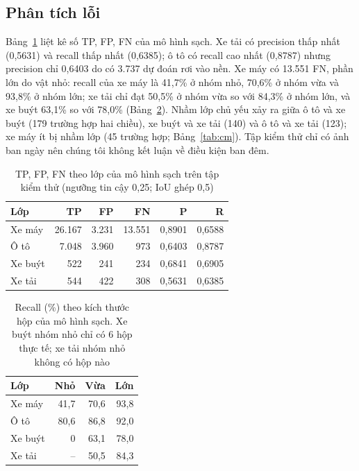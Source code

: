 \documentclass[10pt,journal,letterpaper]{IEEEtran}
\begin{document}
\subsection{Phân tích lỗi}
Bảng~\ref{tab:err} liệt kê số TP, FP, FN của mô hình sạch. Xe tải có precision thấp nhất (0,5631) và recall thấp nhất (0,6385); ô tô có recall cao nhất (0,8787) nhưng precision chỉ 0,6403 do có 3.737 dự đoán rơi vào nền. Xe máy có 13.551 FN, phần lớn do vật nhỏ: recall của xe máy là 41,7\% ở nhóm nhỏ, 70,6\% ở nhóm vừa và 93,8\% ở nhóm lớn; xe tải chỉ đạt 50,5\% ở nhóm vừa so với 84,3\% ở nhóm lớn, và xe buýt 63,1\% so với 78,0\% (Bảng~\ref{tab:size}). Nhầm lớp chủ yếu xảy ra giữa ô tô và xe buýt (179 trường hợp hai chiều), xe buýt và xe tải (140) và ô tô và xe tải (123); xe máy ít bị nhầm lớp (45 trường hợp; Bảng~\ref{tab:cm}). Tập kiểm thử chỉ có ảnh ban ngày nên chúng tôi không kết luận về điều kiện ban đêm.

\begin{table}[!t]
\caption{TP, FP, FN theo lớp của mô hình sạch trên tập kiểm thử (ngưỡng tin cậy 0,25; IoU ghép 0,5)}
\label{tab:err}
\centering
\footnotesize
\begin{tabular}{lrrrrr}
\toprule
Lớp & TP & FP & FN & P & R \\
\midrule
Xe máy & 26.167 & 3.231 & 13.551 & 0,8901 & 0,6588 \\
Ô tô & 7.048 & 3.960 & 973 & 0,6403 & 0,8787 \\
Xe buýt & 522 & 241 & 234 & 0,6841 & 0,6905 \\
Xe tải & 544 & 422 & 308 & 0,5631 & 0,6385 \\
\bottomrule
\end{tabular}
\end{table}

\begin{table}[!t]
\caption{Recall (\%) theo kích thước hộp của mô hình sạch. Xe buýt nhóm nhỏ chỉ có 6 hộp thực tế; xe tải nhóm nhỏ không có hộp nào}
\label{tab:size}
\centering
\footnotesize
\begin{tabular}{lrrr}
\toprule
Lớp & Nhỏ & Vừa & Lớn \\
\midrule
Xe máy & 41,7 & 70,6 & 93,8 \\
Ô tô & 80,6 & 86,8 & 92,0 \\
Xe buýt & 0 & 63,1 & 78,0 \\
Xe tải & -- & 50,5 & 84,3 \\
\bottomrule
\end{tabular}
\end{table}
\end{document}
